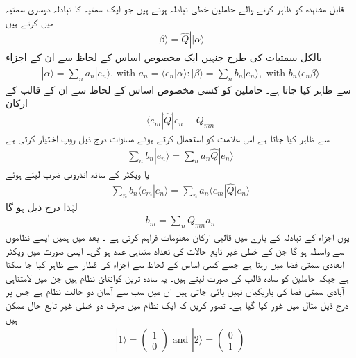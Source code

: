 قابل مشاہدہ کو ظاہر کرنے والے حاملین خطی تبادلہ ہوتے ہیں جو ایک سمتیہ کا تبادلہ دوسری سمتیہ میں کرتے ہیں 
\begin{align}
| \beta \rangle = \hat{Q}|| \alpha \rangle
\end{align}
بالکل سمتیات کی طرح جنہیں ایک مخصوص اساس  کے لحاظ سے ان کے اجزاء 
\begin{align}
| \alpha \rangle = \sum_{n} a_{n} | e_{n} \rangle. \text{ with } a_{n} = \langle e_{n} | \alpha \rangle : | \beta \rangle = \sum_{n} b_{n} | e_{n} \rangle , \text{ with } b_{n} \langle e_{n} \beta \rangle
\end{align}
سے ظاہر کیا جاتا ہے۔ حاملین کو کسی مخصوص اساس کے لحاظ سے ان کے قالب کے ارکان 
\begin{align}
\langle e_{m} | \hat{Q} | e_{n} \equiv Q_{mn}
\end{align}
سے ظاہر کیا جاتا ہے 
اس علامت کو استعمال کرتے ہوئے مساوات
 درج ذیل روپ اختیار کرتی ہے 
\begin{align}
\sum_{n} b_{n} | e_{n} \rangle = \sum_{n} a_{n} \hat{Q} | e_{n} \rangle
\end{align}
یا ویکٹر  کے ساتھ اندرونی ضرب لیتے ہوئے 
\begin{align}
\sum_{n} b_{n} \langle e_{m} | e_{n} \rangle = \sum_{n} a_{n} \langle e_{m} | \hat{Q} | e_{n} \rangle
\end{align}
لہٰذا درج ذیل ہو گا 
\begin{align}
b_{m} = \sum_{n} Q_{mn}a_{n}
\end{align}
یوں اجزاء کے تبادلہ کے بارے میں قالبی ارکان معلومات فراہم کرتی ہے ۔
بعد میں ہمیں ایسے نظاموں سے واسطہ ہو گا جن کے خطی غیر تابع حالات کی تعداد متناہی عدد  ہو گی۔ ایسی صورت میں ویکٹر   ابعادی سمتی فضا میں رہتا ہے جسے کسی اساس کے لحاظ سے  اجزاء کی قطار سے ظاہر کیا جا سکتا ہے جبکہ حاملین کو  سادہ قالب کی صورت لیتے ہیں۔ یہ سادہ ترین کوانٹائ نظام ہیں جن میں لامتناہی آبادی سمتی فضا کی باریکیاں نہیں پائی جاتی ہیں ان میں سب سے آسان دو حالت نظام ہے جس پر درج ذیل مثال میں غور کیا گیا ہے۔
تصور کریں کہ ایک نظام میں صرف دو خطی غیر تابع حال ممکن ہیں 
\begin{align*}
|1\rangle = \begin{pmatrix} 1 \\ 0 \end{pmatrix} \text{ and } |2\rangle = \begin{pmatrix} 0 \\ 1  \end{pmatrix}
\end{align*}
